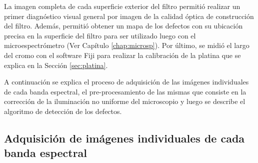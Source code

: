 La imagen completa de cada superficie exterior del filtro permitió realizar un primer diagnóstico visual general por imagen de la calidad óptica de construcción del filtro. Además, permitió obtener un mapa de los defectos con su ubicación precisa en la superficie del filtro para ser utilizado luego con el microespectrómetro (Ver Capítulo \ref{chap:microsp}). Por último, se midió el largo del cromo con el software Fiji para realizar la calibración de la platina que se explica en la Sección \ref{sec:platina}.

A continuación se explica el proceso de adquisición de las imágenes individuales de cada banda espectral, el pre-procesamiento de las mismas que consiste en la corrección de la iluminación no uniforme del microscopio y luego se describe el algoritmo de detección de los defectos.

\singlespacing
\subsection{Adquisición de imágenes individuales de cada banda espectral}
\label{sec:cadab}

